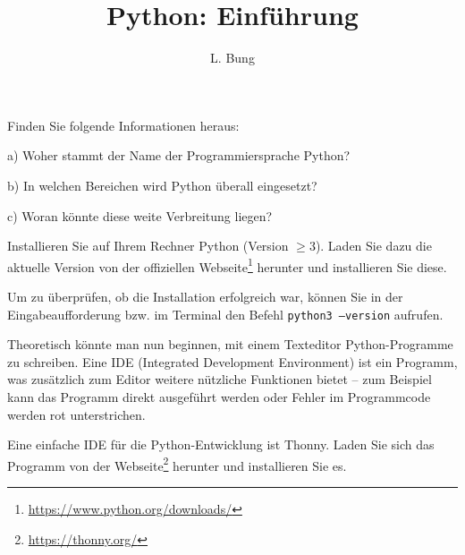 \documentclass[11pt, a4paper, oneside]{article}
\begin{document}
	\author{L. Bung}
	\title{Python: Einführung}
	\subject{Informatik}
	\maketitle
	
	
	Finden Sie folgende Informationen heraus:
	
	a) Woher stammt der Name der Programmiersprache Python?
	
	\lines[3cm]
	
	b) In welchen Bereichen wird Python überall eingesetzt?
	
	\lines[3cm]
	
	c) Woran könnte diese weite Verbreitung liegen?
	
	\lines[3cm]
	
	
	
	
	Installieren Sie auf Ihrem Rechner Python (Version $\geq 3$).
	Laden Sie dazu die aktuelle Version von der offiziellen Webseite\footnote{\url{https://www.python.org/downloads/}} herunter und installieren Sie diese.
	
	Um zu überprüfen, ob die Installation erfolgreich war, können Sie in der Eingabeaufforderung bzw. im Terminal den Befehl \texttt{python3 --version} aufrufen.
	
	
	
	Theoretisch könnte man nun beginnen, mit einem Texteditor Python-Programme zu schreiben.
	Eine IDE (Integrated Development Environment) ist ein Programm, was zusätzlich zum Editor weitere nützliche Funktionen bietet -- zum Beispiel kann das Programm direkt ausgeführt werden oder Fehler im Programmcode werden rot unterstrichen.
	
	Eine einfache IDE für die Python-Entwicklung ist Thonny.
	Laden Sie sich das Programm von der Webseite\footnote{\url{https://thonny.org/}} herunter und installieren Sie es.
	
	
	
\end{document}
